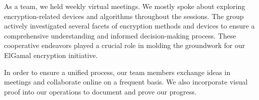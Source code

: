 \documentclass[12pt]{article}
\begin{document}
	
	As a team, we held weekly virtual meetings. We mostly spoke about exploring encryption-related devices and algorithms throughout the sessions. The group actively investigated several facets of encryption methods and devices to ensure a comprehensive understanding and informed decision-making process. These cooperative endeavors played a crucial role in molding the groundwork for our ElGamal encryption initiative.
	
	In order to ensure a unified process, our team members exchange ideas in meetings and collaborate online on a frequent basis. We also incorporate visual proof into our operations to document and prove our progress.
	
\end{document}
